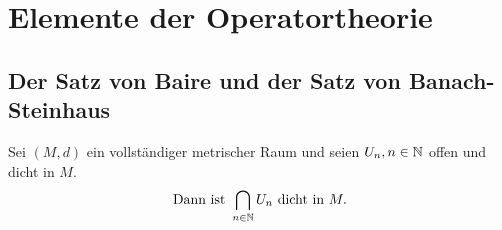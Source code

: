 
\chapter*{Elemente der Operatortheorie}  \setcounter{section}{8}



\section{Der Satz von Baire und der Satz von Banach-Steinhaus}



\begin{satz} \label{satz:9.1-baire} 
	Sei $(M, d)$ ein vollständiger metrischer Raum und seien $U_{n}, n \in \mathbb{N}$ offen und dicht in $M$.
	\[ \text{Dann ist } \bigcap_{n \in \mathbb{N}} U_{n} \text{ dicht in } M. \]
\end{satz}

